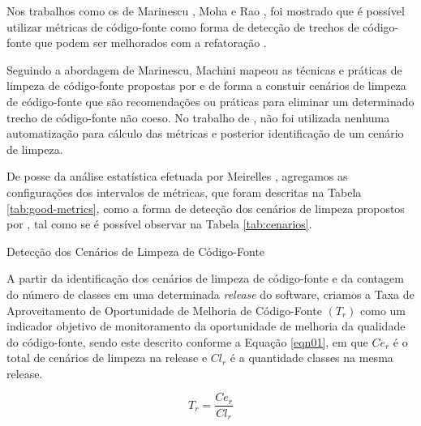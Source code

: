 Nos trabalhos como os de Marinescu \cite{marinescu2005measurement}, Moha \cite{moha2010decor} e Rao \cite{rao2007detecting}, foi mostrado que é possível utilizar métricas de código-fonte como forma de detecção de trechos de código-fonte que podem ser melhorados com a refatoração \cite{fowler1999refactoring}.


Seguindo a abordagem de Marinescu, Machini \cite{Machini2010} mapeou as técnicas e práticas de limpeza de código-fonte propostas por \cite{Martin2008} e \cite{beck2007implementation} de forma a constuir cenários de limpeza de código-fonte que são recomendações ou práticas para eliminar um determinado trecho de código-fonte não coeso. No trabalho de \cite{Machini2010}, não foi utilizada nenhuma automatização para cálculo das métricas e posterior identificação de um cenário de limpeza.

De posse da análise estatística efetuada por Meirelles \cite{Meirelles2013}, agregamos as configurações dos intervalos de métricas, que foram descritas na Tabela \ref{tab:good-metrics}, como a forma de detecção dos cenários de limpeza propostos por \cite{Machini2010}, tal como se é possível observar na Tabela \ref{tab:cenarios}.
	
	\begin{table}[ht]
	\centering
	\caption{Detecção dos Cenários de Limpeza de Código-Fonte}
	\addtolength{\belowcaptionskip}{6pt}
		
	\label{tab:cenarios}
	\end{table}
	\FloatBarrier


A partir da identificação dos cenários de limpeza de código-fonte e da contagem do número de classes em uma determinada \textit{release} do software, criamos a Taxa de Aproveitamento de Oportunidade de Melhoria de Código-Fonte $(T_r)$ como um indicador objetivo de monitoramento da oportunidade de melhoria da qualidade do código-fonte, sendo este descrito conforme a Equação \ref{eqn01}, em que $ Ce_r $ é o total de cenários de limpeza na release e $ Cl_r $ é a quantidade classes na mesma release.

\begin{equation}
\label{eqn01}
T_r =   \frac{{{Ce_r}}}{{Cl_r}}
\end{equation}
